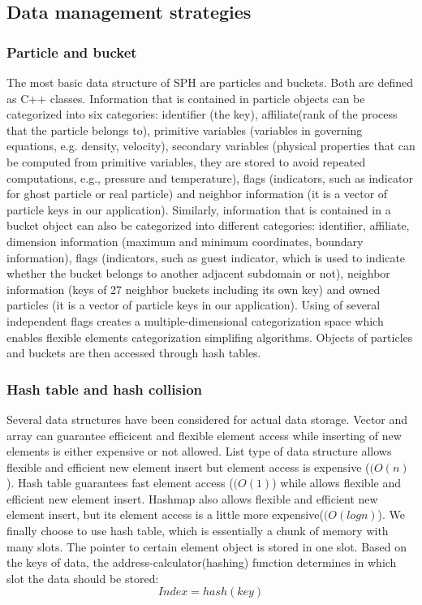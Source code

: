 \subsection{Data management strategies}
\subsubsection{Particle and bucket}
The most basic data structure of SPH are particles and buckets. Both are defined as C++ classes. Information that is contained in particle objects can be categorized into six categories: identifier (the key), affiliate(rank of the process that the particle belongs to), primitive variables (variables in governing equations, e.g. density, velocity), secondary variables (physical properties that can be computed from primitive variables, they are stored to avoid repeated computations, e.g., pressure and temperature), flags (indicators, such as indicator for ghost particle or real particle) and neighbor information (it is a vector of particle keys in our application). Similarly, information that is contained in a bucket object can also be categorized into different categories: identifier, affiliate, dimension information (maximum and minimum coordinates, boundary information), flags (indicators, such as guest indicator, which is used to indicate whether the bucket belongs to another adjacent subdomain or not), neighbor information (keys of 27 neighbor buckets including its own key) and owned particles (it is a vector of particle keys in our application).
Using of several independent flags creates a multiple-dimensional categorization space which enables flexible elements categorization simplifing algorithms.
Objects of particles and buckets are then accessed through hash tables.

\subsubsection{Hash table and hash collision}
Several data structures have been considered for actual data storage. Vector and array can guarantee efficicent and flexible element access while inserting of new elements is either expensive or not allowed. List type of data structure allows flexible and efficient new element insert but element access is expensive ($(O(n)$).
Hash table guarantees fast element access ($(O(1)$) while allows flexible and efficient new element insert. Hashmap also allows flexible and efficient new element insert, but its element access is a little more expensive($(O(logn)$). We finally choose to use hash table, which is essentially a chunk of memory with many slots. The pointer to certain element object is stored in one slot. Based on the keys of data, the address-calculator(hashing) function determines in which slot the data should be stored:
\begin{equation}
Index = hash(key)
\end{equation}

